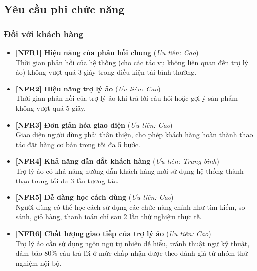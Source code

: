  \subsection{Yêu cầu phi chức năng}

\subsubsection{Đối với khách hàng}

\begin{itemize}

\item \textbf{[NFR1] Hiệu năng của phản hồi chung} \hfill (\textit{Ưu tiên: Cao})\\
    Thời gian phản hồi của hệ thống (cho các tác vụ không liên quan đến trợ lý ảo) không vượt quá 3 giây trong điều kiện tải bình thường.

\item \textbf{[NFR2] Hiệu năng trợ lý ảo} \hfill (\textit{Ưu tiên: Cao})\\
    Thời gian phản hồi của trợ lý ảo khi trả lời câu hỏi hoặc gợi ý sản phẩm không vượt quá 5 giây.

\item \textbf{[NFR3] Đơn giản hóa giao diện} \hfill (\textit{Ưu tiên: Cao})\\
    Giao diện người dùng phải thân thiện, cho phép khách hàng hoàn thành thao tác đặt hàng cơ bản trong tối đa 5 bước.

\item \textbf{[NFR4] Khả năng dẫn dắt khách hàng} \hfill (\textit{Ưu tiên: Trung bình})\\
    Trợ lý ảo có khả năng hướng dẫn khách hàng mới sử dụng hệ thống thành thạo trong tối đa 3 lần tương tác.

\item \textbf{[NFR5] Dễ dàng học cách dùng} \hfill (\textit{Ưu tiên: Cao})\\
    Người dùng có thể học cách sử dụng các chức năng chính như tìm kiếm, so sánh, giỏ hàng, thanh toán chỉ sau 2 lần thử nghiệm thực tế.

\item \textbf{[NFR6] Chất lượng giao tiếp của trợ lý ảo} \hfill (\textit{Ưu tiên: Cao})\\
    Trợ lý ảo cần sử dụng ngôn ngữ tự nhiên dễ hiểu, tránh thuật ngữ kỹ thuật, đảm bảo 80\% câu trả lời ở mức chấp nhận được theo đánh giá từ nhóm thử nghiệm nội bộ.

\end{itemize}

